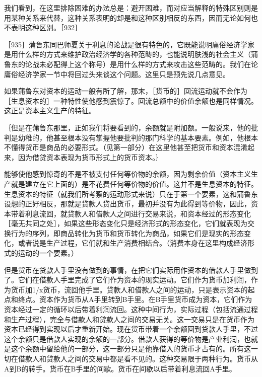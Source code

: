 我们看到，在这里排除困难的办法总是：避开困难，而对应当解释的特殊区别则是用某种关系来代替，这种关系表明的却是和这种区别相反的东西，因而无论如何也不表明这种区别。［932］


［935］蒲鲁东同巴师夏关于利息的论战是很有特色的，它既能说明庸俗经济学家是用什么样的方式来维护政治经济学的各种范畴的，也能说明肤浅的社会主义（蒲鲁东的论战未必配得上这个称号）是用什么样的方式来攻击这些范畴的。我们在论庸俗经济学家一节中将回过头来谈这个问题。这里只是预先说几点意见。

如果蒲鲁东对资本的运动一般有所了解，那末，［货币的］回流运动就不会作为［生息资本的］一种特性使他感到震惊了。回流总额中的价值余额也是同样情况。这正是资本主义生产的特征。

｛但是在蒲鲁东那里，正如我们将要看到的，余额就是附加额。一般说来，他的批判是幼稚的，他甚至根本没有掌握他要批判的那门科学的基本要素。例如，他根本不懂得货币是商品的必要形式。（见第一部分）在这里他甚至把货币和资本混淆起来，因为借贷资本表现为货币形式上的货币资本。｝

能够使他感到惊奇的不是不被支付任何等价物的余额，因为剩余价值（资本主义生产就是建立在它上面的）是不花费任何等价物的价值。这并不是生息资本的特征。生息资本的特征（就我们所考察的运动形式来说）只在于第一个要素，这和蒲鲁东设想的正好相反，那就是贷款人贷出货币，最初并没有为此得到等价物，因此，资本带着利息流回，就贷款人和借款人之间进行交易来说，和资本经过的形态变化［毫无共同之处］，如果这些形态变化只是经济形式的形态变化，它们就表现为交换行为的序列，即商品转化为货币和货币转化为商品，如果它们是现实的形态变化，或者说是生产过程，它们就和生产消费相结合。（消费本身在这里构成经济形式的运动的一个要素。）

但是货币在贷款人手里没有做到的事情，在把它们实际用作资本的借款人手里做到了。它们在借款人手里完成了它们作为资本的现实运动。它们作为货币加利润，作为货币加1/x货币，流回他手里。贷款人和借款人之间的运动，只是表示资本的起点和终点。资本作为货币从A手里转到B手里。在B手里货币成为资本，它们作为资本经过一定的循环以后带着利润流回。这种中间行为，实际过程（包括流通过程和生产过程），完全与借款人和贷款人之间的交易无关。这一交易只是在货币作为资本已经得到实现以后才重新开始。现在货币带着一个余额回到贷款人手里，不过这个余额只是借款人实现的余额的一部分。借款人获得的等价物是产业利润，也就是这个余额中留给他的一部分，这一部分只是他靠借入的货币才占有的。所有这一切在借款人和贷款人之间的交易中都是看不见的。这种交易限于两种行为。货币从A到B的转手。货币在B手里的间歇。货币在间歇以后带着利息流回A手里。

